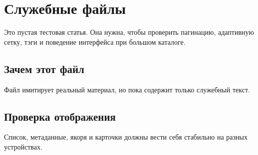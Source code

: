 \section{Служебные файлы}

Это пустая тестовая статья. Она нужна, чтобы проверить пагинацию, адаптивную сетку, тэги и поведение интерфейса при большом каталоге.

\subsection{Зачем этот файл}

Файл имитирует реальный материал, но пока содержит только служебный текст.

\subsection{Проверка отображения}

Список, метаданные, якоря и карточки должны вести себя стабильно на разных устройствах.
